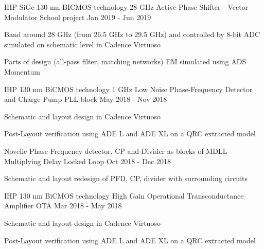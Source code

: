 \begin{cventries}

\cventry
{IHP SiGe 130 nm BICMOS technology} %
{28 GHz Active Phase Shifter - Vector Modulator} %
{School project} %
{Jan 2019 - Jun 2019} %
{ %
\begin{cvitems}
    \item {Band around 28 GHz (from 26.5 GHz to 29.5 GHz) and controlled by 8-bit ADC simulated on schematic level in Cadence Virtuoso}
    \item {Parts of design (all-pass filter, matching networks) EM simulated using ADS Momentum}
\end{cvitems} 
}


\cventry
{IHP 130 nm BiCMOS technology} %
{1 GHz Low Noise Phase-Frequency Detector and Charge Pump} %
{PLL block} %
{May 2018 - Nov 2018} %
{ %
\begin{cvitems}
    \item {Schematic and layout design in Cadence Virtuoso}
    \item {Post-Layout verification using ADE L and ADE XL on a QRC extracted model}
\end{cvitems}
}


\cventry
{Novelic} %
{Phase-Frequency detector, CP and Divider as blocks of MDLL} %
{Multiplying Delay Locked Loop} %
{Oct 2018 - Dec 2018} %
{ %
\begin{cvitems}
    \item {Schematic and layout redesign of PFD, CP, divider with surrounding circuits}
\end{cvitems}
}

\cventry
{IHP 130 nm BiCMOS technology} %
{High Gain Operational Transconductance Amplifier} %
{OTA} %
{Mar 2018 - May 2018} %
{ %
\begin{cvitems}
\item {Schematic and layout design in Cadence Virtuoso}
\item {Post-Layout verification using ADE L and ADE XL on a QRC extracted model}
\end{cvitems}
}


\end{cventries}
